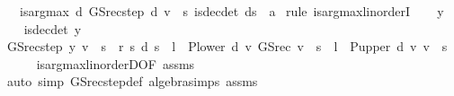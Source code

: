 \begin{isabellebody}
\ \ \ {\isachardoublequoteopen}is{\isacharunderscore}{\kern0pt}arg{\isacharunderscore}{\kern0pt}max\ {\isacharparenleft}{\kern0pt}{\isasymlambda}d{\isachardot}{\kern0pt}\ GS{\isacharunderscore}{\kern0pt}rec{\isacharunderscore}{\kern0pt}step\ d\ v\ {\isachardollar}{\kern0pt}\ s{\isacharprime}{\kern0pt}{\isacharparenright}{\kern0pt}\ is{\isacharunderscore}{\kern0pt}dec{\isacharunderscore}{\kern0pt}det\ {\isacharparenleft}{\kern0pt}d{\isacharparenleft}{\kern0pt}s\ {\isacharcolon}{\kern0pt}{\isacharequal}{\kern0pt}\ a{\isacharparenright}{\kern0pt}{\isacharparenright}{\kern0pt}{\isachardoublequoteclose}\isanewline
%
\isadelimproof
%
\endisadelimproof
%
\isatagproof
{}\isamarkupfalse%
\ {\isacharparenleft}{\kern0pt}rule\ is{\isacharunderscore}{\kern0pt}arg{\isacharunderscore}{\kern0pt}max{\isacharunderscore}{\kern0pt}linorderI{\isacharparenright}{\kern0pt}\isanewline
\ \ \isamarkupfalse%
\ y\isanewline
\ \ \isamarkupfalse%
\ {\isachardoublequoteopen}is{\isacharunderscore}{\kern0pt}dec{\isacharunderscore}{\kern0pt}det\ y{\isachardoublequoteclose}\isanewline
\ \ \isamarkupfalse%
\ {\isachardoublequoteopen}GS{\isacharunderscore}{\kern0pt}rec{\isacharunderscore}{\kern0pt}step\ y\ v\ {\isachardollar}{\kern0pt}\ s{\isacharprime}{\kern0pt}\ {\isasymle}\ r\ {\isacharparenleft}{\kern0pt}s{\isacharprime}{\kern0pt}{\isacharcomma}{\kern0pt}\ d\ s{\isacharprime}{\kern0pt}{\isacharparenright}{\kern0pt}\ {\isacharplus}{\kern0pt}\ l\ {\isacharasterisk}{\kern0pt}\ {\isacharparenleft}{\kern0pt}P{\isacharunderscore}{\kern0pt}lower\ d\ {\isacharasterisk}{\kern0pt}v\ GS{\isacharunderscore}{\kern0pt}rec\ v{\isacharparenright}{\kern0pt}\ {\isachardollar}{\kern0pt}\ s{\isacharprime}{\kern0pt}\ {\isacharplus}{\kern0pt}\ l\ {\isacharasterisk}{\kern0pt}\ {\isacharparenleft}{\kern0pt}P{\isacharunderscore}{\kern0pt}upper\ d\ {\isacharasterisk}{\kern0pt}v\ v{\isacharparenright}{\kern0pt}\ {\isachardollar}{\kern0pt}\ s{\isacharprime}{\kern0pt}{\isachardoublequoteclose}\isanewline
\ \ \ \ \isamarkupfalse%
\ is{\isacharunderscore}{\kern0pt}arg{\isacharunderscore}{\kern0pt}max{\isacharunderscore}{\kern0pt}linorderD{\isacharbrackleft}{\kern0pt}OF\ assms{\isacharparenleft}{\kern0pt}{}{\isacharparenright}{\kern0pt}{\isacharbrackright}{\kern0pt}\isanewline
\ \ \ \ \isamarkupfalse%
\ {\isacharparenleft}{\kern0pt}auto\ simp{\isacharcolon}{\kern0pt}\ GS{\isacharunderscore}{\kern0pt}rec{\isacharunderscore}{\kern0pt}step{\isacharunderscore}{\kern0pt}def\ algebra{\isacharunderscore}{\kern0pt}simps\ assms{\isacharparenleft}{\kern0pt}{}{\isacharparenright}{\kern0pt}{\isacharparenright}{\kern0pt}\isanewline

\end{isabellebody}
